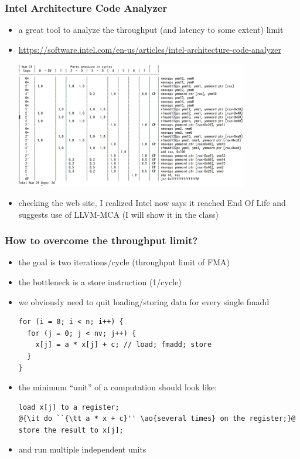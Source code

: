 \documentclass[12pt,dvipdfmx]{beamer}
\newcommand{\ao}[1]{{\color{blue}#1}}
\begin{document}
\begin{frame}
\frametitle{Intel Architecture Code Analyzer}

\begin{itemize}
\item a great tool to analyze
  the throughput (and latency to some extent) limit
\item \url{https://software.intel.com/en-us/articles/intel-architecture-code-analyzer}

  \begin{center}
    \includegraphics[width=0.8\textwidth]{out/pdf/img/iaca.pdf}
  \end{center}

\item checking the web site, I realized Intel now says it reached End Of Life and suggests use of LLVM-MCA (I will show it in the class)
\end{itemize}
\end{frame}

\begin{frame}[fragile]
\frametitle{How to overcome the throughput limit?}
\begin{itemize}
\item the goal is two iterations/cycle (throughput limit of FMA)
\item the bottleneck is a store instruction (1/cycle)
  
\item we obviously need to quit loading/storing
  data for every single fmadd
\begin{lstlisting}
for (i = 0; i < n; i++) {
  for (j = 0; j < nv; j++) {
    x[j] = a * x[j] + c; // load; fmadd; store
  }
}
\end{lstlisting}

\item the minimum ``unit'' of a computation
  should look like:

\begin{lstlisting}
load x[j] to a register;
@{\it do ``{\tt a * x + c}'' \ao{several times} on the register;}@
store the result to x[j];
\end{lstlisting}

\item and run multiple independent units
\end{itemize}
\end{frame}
\end{document}

